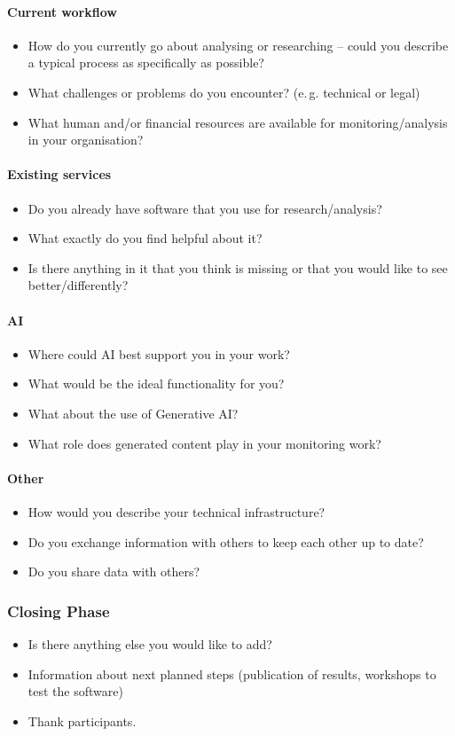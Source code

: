 \documentclass[acmsmall]{acmart}
\begin{document}
\paragraph{Current workflow}
\begin{itemize}
    \item How do you currently go about analysing or researching -- could you describe a typical process as specifically as possible?
    \item What challenges or problems do you encounter? (e.\,g. technical or legal)
    \item What human and/or financial resources are available for monitoring/analysis in your organisation?
\end{itemize}

\paragraph{Existing services}
\begin{itemize}
    \item Do you already have software that you use for research/analysis? 
    \item What exactly do you find helpful about it? 
    \item Is there anything in it that you think is missing or that you would like to see better/differently?
\end{itemize}


\paragraph{AI}
\begin{itemize}
    \item  Where could AI best support you in your work? 
    \item What would be the ideal functionality for you?
    \item What about the use of Generative AI? 
    \item What role does generated content play in your monitoring work?
\end{itemize}

\paragraph{Other}
\begin{itemize}
    \item  How would you describe your technical infrastructure?
    \item Do you exchange information with others to keep each other up to date? 
    \item Do you share data with others? 
\end{itemize}


\subsubsection{Closing Phase}
\begin{itemize}
    \item Is there anything else you would like to add? 
    \item Information about next planned steps (publication of results, workshops to test the software)
    \item Thank participants.
\end{itemize}
\end{document}
